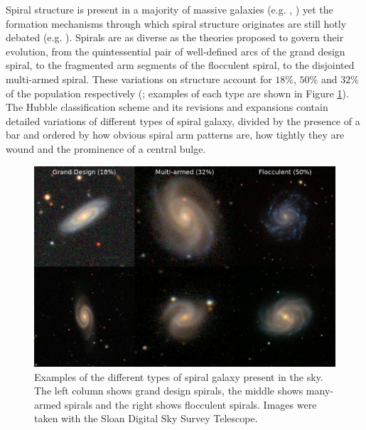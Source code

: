 
Spiral structure is present in a majority of massive galaxies (e.g. \citealt{1989gadv.book..151B}, \citealt{2008MNRAS.389.1179L}) yet the formation mechanisms through which spiral structure originates are still hotly debated (e.g. \citealt{2014PASA...31...35D}). Spirals are as diverse as the theories proposed to govern their evolution, from the quintessential pair of well-defined arcs of the grand design spiral, to the fragmented arm segments of the flocculent spiral, to the disjointed multi-armed spiral. These variations on structure account for $18\%$, $50\%$ and $32\%$ of the population respectively (\citealt{2011ApJ...737...32E}; examples of each type are shown in Figure \ref{fig:spiral-galaxy-types}). The Hubble classification scheme \citep{1926ApJ....64..321H} and its revisions and expansions \citep{1961hag..book.....S,1991rc3..book.....D} contain detailed variations of different types of spiral galaxy, divided by the presence of a bar and ordered by how obvious spiral arm patterns are, how tightly they are wound and the prominence of a central bulge.

\begin{figure}
  \includegraphics[width=13cm]{plots/galaxy_types.png}
  \caption{Examples of the different types of spiral galaxy present in the sky. The left column shows grand design spirals, the middle shows many-armed spirals and the right shows flocculent spirals. Images were taken with the Sloan Digital Sky Survey Telescope.}
  \label{fig:spiral-galaxy-types}
\end{figure}

